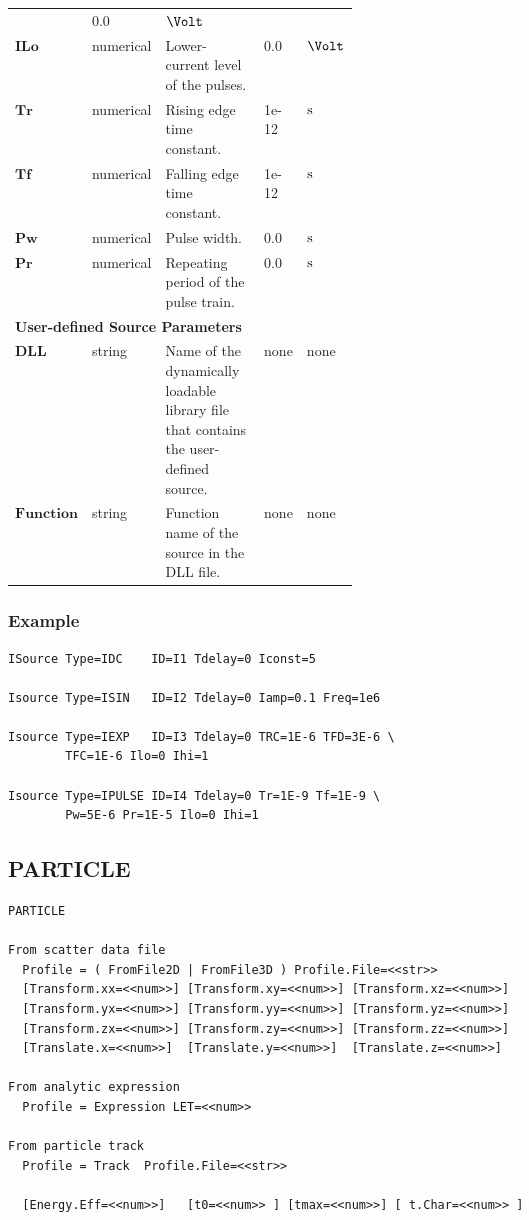\documentclass[oneside,12pt]{cgd_book}
\begin{document}
\begin{longtable}{ll>{\raggedright}p{0.4\linewidth}ll}
& 0.0
& $\Volt$
\\
 $\mathbf{ILo}$
& numerical
& Lower-current level of the pulses.
& 0.0
& $\Volt$
\\
 $\mathbf{Tr}$
& numerical
& Rising edge time constant.
& 1e-12
& $\text{s}$
\\
 $\mathbf{Tf}$
& numerical
& Falling edge time constant.
& 1e-12
& $\text{s}$
\\
 $\mathbf{Pw}$
& numerical
& Pulse width.
& 0.0
& $\text{s}$
\\
 $\mathbf{Pr}$
& numerical
& Repeating period of the pulse train.
& 0.0
& $\text{s}$\\
\multicolumn{5}{l}{\textbf{User-defined Source Parameters}}
\\
 $\mathbf{DLL}$
& string
& Name of the dynamically loadable library file that contains the user-defined source.
& none
& none
\\
 $\mathbf{Function}$
& string
& Function name of the source in the DLL file.
& none
& none\\
\end{longtable}

\subsubsection{Example}
\begin{lstlisting}[style=GeniusCode]
ISource Type=IDC    ID=I1 Tdelay=0 Iconst=5

Isource Type=ISIN   ID=I2 Tdelay=0 Iamp=0.1 Freq=1e6

Isource Type=IEXP   ID=I3 Tdelay=0 TRC=1E-6 TFD=3E-6 \
        TFC=1E-6 Ilo=0 Ihi=1

Isource Type=IPULSE ID=I4 Tdelay=0 Tr=1E-9 Tf=1E-9 \
        Pw=5E-6 Pr=1E-5 Ilo=0 Ihi=1
\end{lstlisting}
\subsection{PARTICLE}
\par
\begin{lstlisting}[style=GeniusCmd]
PARTICLE

From scatter data file
  Profile = ( FromFile2D | FromFile3D ) Profile.File=<<str>>
  [Transform.xx=<<num>>] [Transform.xy=<<num>>] [Transform.xz=<<num>>]
  [Transform.yx=<<num>>] [Transform.yy=<<num>>] [Transform.yz=<<num>>]
  [Transform.zx=<<num>>] [Transform.zy=<<num>>] [Transform.zz=<<num>>]
  [Translate.x=<<num>>]  [Translate.y=<<num>>]  [Translate.z=<<num>>]

From analytic expression
  Profile = Expression LET=<<num>>

From particle track
  Profile = Track  Profile.File=<<str>>

  [Energy.Eff=<<num>>]   [t0=<<num>> ] [tmax=<<num>>] [ t.Char=<<num>> ]
\end{lstlisting}
\par
\end{document}
